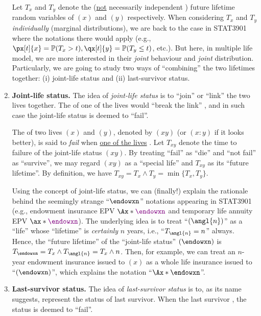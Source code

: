 \begin{enumerate}
Let \(T_x\) and \(T_y\) denote the (\underline{not} necessarily independent
\warn{}) future lifetime random variables of \((x)\) and \((y)\) respectively.
When considering \(T_x\) and \(T_y\) \emph{individually} (marginal
distributions), we are back to the case in STAT3901 where the notations there
would apply (e.g., \(\px[t]{x}=\prob{T_x>t}, \qx[t]{y}=\prob{T_y\le t}\),
etc.). But here, in multiple life model, we are more interested in their
\emph{joint} behaviour and \emph{joint} distribution. Particularly, we are
going to study two ways of ``combining'' the two lifetimes together: (i)
joint-life status and (ii) last-survivor status.

\item \textbf{Joint-life status.} The idea of \emph{joint-life status} is to
``join'' or ``link''  the two lives together. The 
 of one of the lives would ``break the link'' ,
and in such case the joint-life status is deemed to ``fail''.

The  of two lives \((x)\) and \((y)\), denoted by
\((xy)\) (or \((x\!:\!y)\) if it looks better), is said to \emph{fail} when
\underline{one of the lives}  . Let \(T_{xy}\) denote
the time to failure of the joint-life status \((xy)\). By treating ``fail''
as ``die'' and ``not fail'' as ``survive'', we may regard \((xy)\) as a
``special life'' and \(T_{xy}\) as its ``future lifetime''. By definition, we
have \(T_{xy}=T_x\wedge T_y=\min\{T_x,T_y\}\).

Using the concept of joint-life status, we can (finally!) explain the rationale
behind the seemingly strange ``\(\endowxn\)'' notations appearing in STAT3901
(e.g., endowment insurance EPV \(\Ax*{\vc{\endowxn}}\) and temporary life
annuity EPV \(\ax*{\vc{\endowxn}}\)).  The underlying idea is to treat
``\((\angl{n})\)'' as a ``life'' whose ``lifetime'' is \emph{certainly} \(n\)
years, i.e., ``\(T_{\angl{n}}=n\)'' always. Hence, the ``future lifetime'' of
the ``joint-life status'' \((\endowxn)\) is \(T_{\endowxn}=T_x\wedge
T_{\angl{n}}=T_x\wedge n\).  Then, for example, we can treat an \(n\)-year
endowment insurance issued to \((x)\) as a whole life insurance issued to
``\((\endowxn)\)'', which explains the notation ``\(\Ax*{\endowxn}\)''.

\item \textbf{Last-survivor status.} The idea of \emph{last-survivor status} is
to, as its name suggests, represent the status of last survivor. When the last
survivor  , the status is deemed to ``fail''.


\end{enumerate}
